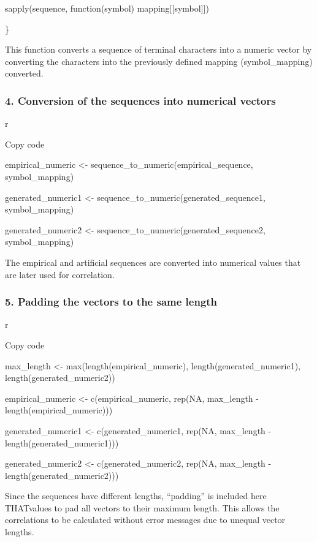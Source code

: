 \documentclass[
]{article}
\begin{document}
sapply(sequence, function(symbol) mapping{[}{[}symbol{]}{]})

\}

This function converts a sequence of terminal characters into a numeric
vector by converting the characters into the previously defined mapping
(symbol\_mapping) converted.

\subsubsection{\texorpdfstring{\textbf{4. Conversion of the sequences
into numerical
vectors}}{4. Conversion of the sequences into numerical vectors}}\label{conversion-of-the-sequences-into-numerical-vectors}

r

Copy code

empirical\_numeric \textless- sequence\_to\_numeric(empirical\_sequence,
symbol\_mapping)

generated\_numeric1 \textless-
sequence\_to\_numeric(generated\_sequence1, symbol\_mapping)

generated\_numeric2 \textless-
sequence\_to\_numeric(generated\_sequence2, symbol\_mapping)

The empirical and artificial sequences are converted into numerical
values \hspace{0pt}\hspace{0pt}that are later used for correlation.

\subsubsection{\texorpdfstring{\textbf{5. Padding the vectors to the
same
length}}{5. Padding the vectors to the same length}}\label{padding-the-vectors-to-the-same-length}

r

Copy code

max\_length \textless- max(length(empirical\_numeric),
length(generated\_numeric1), length(generated\_numeric2))

empirical\_numeric \textless- c(empirical\_numeric, rep(NA, max\_length
- length(empirical\_numeric)))

generated\_numeric1 \textless- c(generated\_numeric1, rep(NA,
max\_length - length(generated\_numeric1)))

generated\_numeric2 \textless- c(generated\_numeric2, rep(NA,
max\_length - length(generated\_numeric2)))

Since the sequences have different lengths, ``padding'' is included here
THATvalues \hspace{0pt}\hspace{0pt}to pad all vectors to their maximum
length. This allows the correlations to be calculated without error
messages due to unequal vector lengths.
\end{document}
